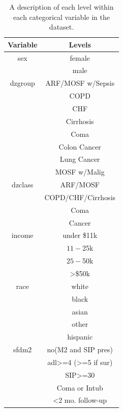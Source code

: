 \documentclass[
]{jss}
\begin{document}
\begin{table}[ht]
\centering
\begin{tabular}{cc}
\hline
\textbf{Variable} & \textbf{Levels}                      \\
\hline
sex      & female                                        \\
         & male                                          \\
dzgroup  & ARF/MOSF w/Sepsis                             \\
         & COPD                                          \\
         & CHF                                           \\
         & Cirrhosis                                     \\
         & Coma                                          \\
         & Colon Cancer                                  \\
         & Lung Cancer                                   \\
         & MOSF w/Malig                                  \\
dzclass  & ARF/MOSF                                      \\
         & COPD/CHF/Cirrhosis                            \\
         & Coma                                          \\
         & Cancer                                        \\
income   & under \$11k                                   \\
         & $11-$25k                                      \\
         & $25-$50k                                      \\
         & \textgreater{}\$50k                           \\
race     & white                                         \\
         & black                                         \\
         & asian                                         \\
         & other                                         \\
         & hispanic                                      \\
sfdm2    & no(M2 and SIP pres)                           \\
         & adl\textgreater{}=4 (\textgreater{}=5 if sur) \\
         & SIP\textgreater{}=30                          \\
         & Coma or Intub                                 \\
         & \textless{}2 mo. follow-up                   
\end{tabular}
\caption{A description of each level within each categorical variable in the dataset.}
\label{tab:support2}
\end{table}
\end{document}
